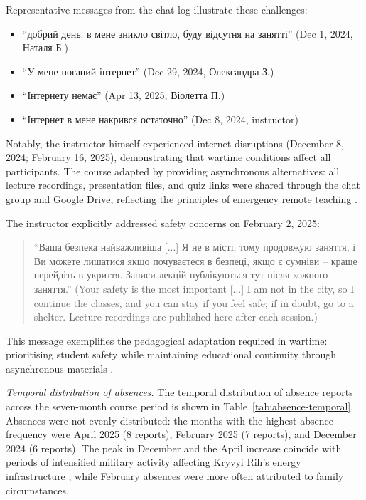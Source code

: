 Representative messages from the chat log illustrate these challenges:
\begin{itemize}
\item ``добрий день. в мене зникло світло, буду відсутня на занятті'' (Dec 1, 2024, Наталя Б.)
\item ``У мене поганий інтернет'' (Dec 29, 2024, Олександра З.)
\item ``Інтернету немає'' (Apr 13, 2025, Віолетта П.)
\item ``Інтернет в мене накрився остаточно'' (Dec 8, 2024, instructor)
\end{itemize}

Notably, the instructor himself experienced internet disruptions (December 8, 2024; February 16, 2025), demonstrating that wartime conditions affect all participants. The course adapted by providing asynchronous alternatives: all lecture recordings, presentation files, and quiz links were shared through the chat group and Google Drive, reflecting the principles of emergency remote teaching \cite{Striuk_2022, Hlianenko2024}.

The instructor explicitly addressed safety concerns on February 2, 2025:
\begin{quote}
``Ваша безпека найважливіша [...] Я не в місті, тому продовжую заняття, і Ви можете лишатися якщо почуваєтеся в безпеці, якщо є сумніви -- краще перейдіть в укриття. Записи лекцій публікуються тут після кожного заняття.'' (Your safety is the most important [...] I am not in the city, so I continue the classes, and you can stay if you feel safe; if in doubt, go to a shelter. Lecture recordings are published here after each session.)
\end{quote}

This message exemplifies the pedagogical adaptation required in wartime: prioritising student safety while maintaining educational continuity through asynchronous materials \cite{UNESCO2023}.

\textit{Temporal distribution of absences.} The temporal distribution of absence reports across the seven-month course period is shown in Table~\ref{tab:absence-temporal}. Absences were not evenly distributed: the months with the highest absence frequency were April 2025 (8 reports), February 2025 (7 reports), and December 2024 (6 reports). The peak in December and the April increase coincide with periods of intensified military activity affecting Kryvyi Rih's energy infrastructure \cite{Humeniuk2022113}, while February absences were more often attributed to family circumstances.

